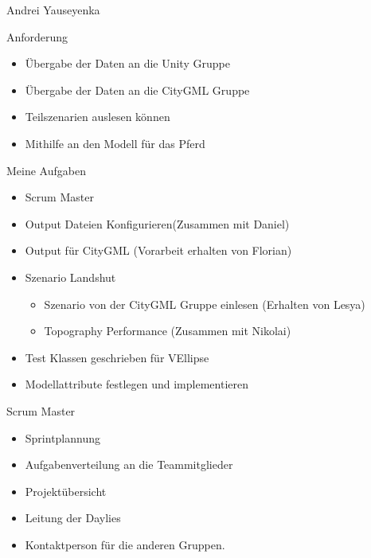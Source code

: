 \graphicspath{{appendix/images/}}

\begin{frame}
	\begin{center}
		\begin{Large}
			Andrei Yauseyenka
		\end{Large}
	\end{center}
\end{frame}

\begin{frame}{Anforderung}
	\begin{itemize}
		\item Übergabe der Daten an die Unity Gruppe
		\item Übergabe der Daten an die CityGML Gruppe
		\item Teilszenarien auslesen können
		\item Mithilfe an den Modell für das Pferd
	\end{itemize}
\end{frame}

\begin{frame}{Meine Aufgaben}
	\begin{itemize}
		\item Scrum Master
		\item Output Dateien Konfigurieren(Zusammen mit Daniel)
		\item Output für CityGML (Vorarbeit erhalten von Florian)
		\item Szenario Landshut
		\begin{itemize}
			\item Szenario von der CityGML Gruppe einlesen (Erhalten von Lesya)
			\item Topography Performance (Zusammen mit Nikolai)
		\end{itemize}
		\item Test Klassen geschrieben für VEllipse
		\item Modellattribute festlegen und implementieren
	\end{itemize}
\end{frame}

\begin{frame}{Scrum Master}
	\begin{itemize}
		\item Sprintplannung 
		\item Aufgabenverteilung an die Teammitglieder
		\item Projektübersicht
		\item Leitung der Daylies
		\item Kontaktperson für die anderen Gruppen.
	\end{itemize}
\end{frame}

